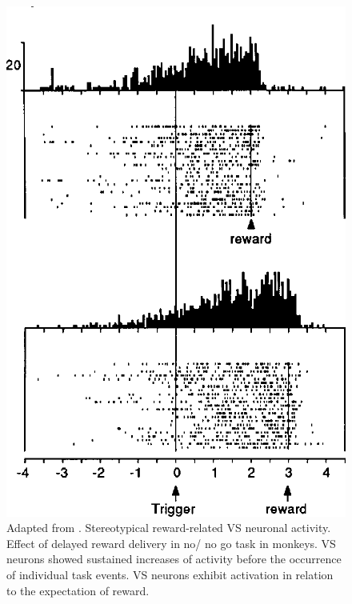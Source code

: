 \begin{figure}[H]
    \centering
    \includegraphics[scale=0.22]{figures/StriatumR.png}
    \caption{Adapted from \cite{Schultz1992}. Stereotypical reward-related VS neuronal activity. Effect of delayed reward delivery in no/ no go task in monkeys. VS neurons showed sustained increases of activity before the occurrence of individual task events. VS neurons exhibit activation in relation to the expectation of reward.}
    \label{fig:StriatumN}
\end{figure}
